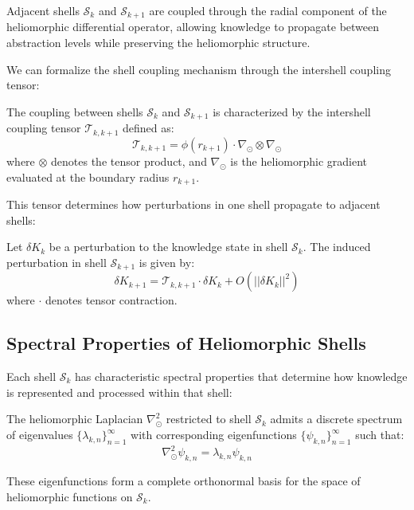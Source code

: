 \begin{corollary}
Adjacent shells $\mathcal{S}_k$ and $\mathcal{S}_{k+1}$ are coupled through the radial component of the heliomorphic differential operator, allowing knowledge to propagate between abstraction levels while preserving the heliomorphic structure.
\end{corollary}

We can formalize the shell coupling mechanism through the intershell coupling tensor:

\begin{definition}
The coupling between shells $\mathcal{S}_k$ and $\mathcal{S}_{k+1}$ is characterized by the intershell coupling tensor $\mathcal{T}_{k,k+1}$ defined as:
\begin{equation}
\mathcal{T}_{k,k+1} = \phi(r_{k+1}) \cdot \nabla_{\odot} \otimes \nabla_{\odot}
\end{equation}
where $\otimes$ denotes the tensor product, and $\nabla_{\odot}$ is the heliomorphic gradient evaluated at the boundary radius $r_{k+1}$.
\end{definition}

This tensor determines how perturbations in one shell propagate to adjacent shells:

\begin{theorem}
Let $\delta K_k$ be a perturbation to the knowledge state in shell $\mathcal{S}_k$. The induced perturbation in shell $\mathcal{S}_{k+1}$ is given by:
\begin{equation}
\delta K_{k+1} = \mathcal{T}_{k,k+1} \cdot \delta K_k + O(||\delta K_k||^2)
\end{equation}
where $\cdot$ denotes tensor contraction.
\end{theorem}

\subsection{Spectral Properties of Heliomorphic Shells}

Each shell $\mathcal{S}_k$ has characteristic spectral properties that determine how knowledge is represented and processed within that shell:

\begin{theorem}
The heliomorphic Laplacian $\nabla_{\odot}^2$ restricted to shell $\mathcal{S}_k$ admits a discrete spectrum of eigenvalues $\{\lambda_{k,n}\}_{n=1}^{\infty}$ with corresponding eigenfunctions $\{\psi_{k,n}\}_{n=1}^{\infty}$ such that:
\begin{equation}
\nabla_{\odot}^2 \psi_{k,n} = \lambda_{k,n} \psi_{k,n}
\end{equation}

These eigenfunctions form a complete orthonormal basis for the space of heliomorphic functions on $\mathcal{S}_k$.
\end{theorem}

